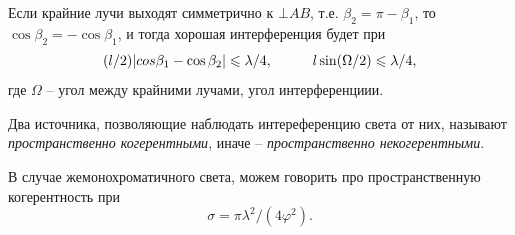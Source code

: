 Если крайние лучи выходят симметрично к $\bot AB$, т.е. $\beta_2 = \pi-\beta_1$, то $\cos \beta_2 = - \cos \beta_1$, и тогда хорошая интерференция будет при
\begin{equation*}
    (l/2) |cos\beta_1-\cos \beta_2| \leq \lambda/4,
    \hspace{10 mm} 
    l \sin (\Omega/2) \leq \lambda/4,
\end{equation*}
где $\Omega$ -- угол между крайними лучами, угол интерференциии. 


\begin{to_def}
    Два источника, позволяющие наблюдать интереференцию света от них, называют \textit{пространственно когерентными}, иначе -- \textit{пространственно некогерентными}. 
\end{to_def}

В случае жемонохроматичного света, можем говорить про пространственную когерентность при 
\begin{equation*}
    \sigma =\pi \lambda^2 / (4 \varphi^2). 
\end{equation*}